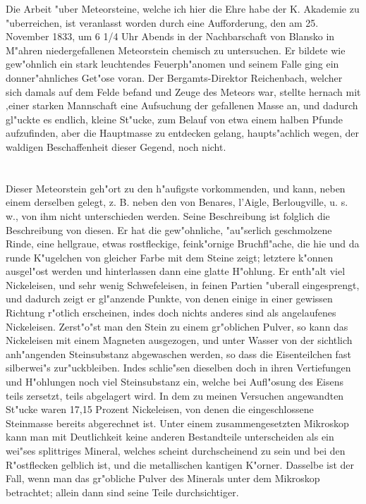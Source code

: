 \documentclass[a4paper, 11pt, oneside]{article}
\begin{document}
Die Arbeit "uber Meteorsteine, welche ich hier die Ehre habe der K. Akademie zu "uberreichen, ist veranlasst worden durch eine Aufforderung, den am 25. November 1833, um 6 1/4 Uhr Abends in der Nachbarschaft von Blansko in M"ahren niedergefallenen Meteorstein chemisch zu untersuchen. Er bildete wie gew"ohnlich ein stark leuchtendes Feuerph"anomen und seinem Falle ging ein donner"ahnliches Get"ose voran. Der Bergamts-Direktor Reichenbach, welcher sich damals auf dem Felde befand und Zeuge des Meteors war, stellte hernach mit ‚einer starken Mannschaft eine Aufsuchung der gefallenen Masse an, und dadurch gl"uckte es endlich, kleine St"ucke, zum Belauf von etwa einem halben Pfunde aufzufinden, aber die Hauptmasse zu entdecken gelang, haupts"achlich wegen, der waldigen Beschaffenheit dieser Gegend, noch nicht.

\section{}
\paragraph{}
Dieser Meteorstein geh"ort zu den h"aufigste vorkommenden, und kann, neben einem derselben gelegt, z. B. neben den von Benares, l’Aigle, Berlougville, u. s. w., von ihm nicht unterschieden werden. Seine Beschreibung ist folglich die Beschreibung von diesen. Er hat die gew"ohnliche, "au"serlich geschmolzene Rinde, eine hellgraue, etwas rostfleckige, feink"ornige Bruchfl"ache, die hie und da runde K"ugelchen von gleicher Farbe mit dem Steine zeigt; letztere k"onnen ausgel"ost werden und hinterlassen dann eine glatte H"ohlung. Er enth"alt viel Nickeleisen, und sehr wenig Schwefeleisen, in feinen Partien "uberall eingesprengt, und dadurch zeigt er gl"anzende Punkte, von denen einige in einer gewissen Richtung r"otlich erscheinen, indes doch nichts anderes sind als angelaufenes Nickeleisen. Zerst"o"st man den Stein zu einem gr"oblichen Pulver, so kann das Nickeleisen mit einem Magneten ausgezogen, und unter Wasser von der sichtlich anh"angenden Steinsubstanz abgewaschen werden, so dass die Eisenteilchen fast silberwei"s zur"uckbleiben. Indes schlie"sen dieselben doch in ihren Vertiefungen und H"ohlungen noch viel Steinsubstanz ein, welche bei Aufl"osung des Eisens teils zersetzt, teils abgelagert wird. In dem zu meinen Versuchen angewandten St"ucke waren 17,15 Prozent Nickeleisen, von denen die eingeschlossene Steinmasse bereits abgerechnet ist. Unter einem zusammengesetzten Mikroskop kann man mit Deutlichkeit keine anderen Bestandteile unterscheiden als ein wei"ses splittriges Mineral, welches scheint durchscheinend zu sein und bei den R"ostflecken gelblich ist, und die metallischen kantigen K"orner. Dasselbe ist der Fall, wenn man das gr"obliche Pulver des Minerals unter dem Mikroskop betrachtet; allein dann sind seine Teile durchsichtiger.
\end{document}

